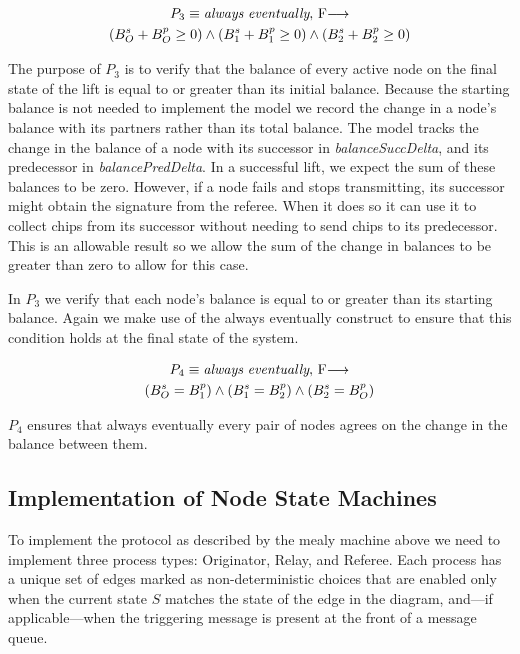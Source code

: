\documentclass[runningheads]{llncs}
\newcommand{\originatorsuccbal}{B^s_O}
\newcommand{\relayasuccbal}{B^s_1}
\newcommand{\relaybsuccbal}{B^s_2}
\newcommand{\originatorpredbal}{B^p_O}
\newcommand{\relayapredbal}{B^p_1}
\newcommand{\relaybpredbal}{B^p_2}
\newcommand{\always}{\emph{always}}
\newcommand{\eventually}{\emph{eventually}}
\newcommand{\fair}{$F$}
\begin{document}
\begin{definition}[Property 3]
\begin{multline*}
P_3 \equiv \always\ \eventually,\ \fair \longrightarrow \\
    (\originatorsuccbal + \originatorpredbal \ge 0) \wedge
    (\relayasuccbal + \relayapredbal \ge 0) \wedge
    (\relaybsuccbal + \relaybpredbal \ge 0) \\
\end{multline*}
\end{definition}

The purpose of $P_3$ is to verify that the balance of every active node on the final state of the lift is equal to or greater than its initial balance. Because the starting balance is not needed to implement the model we record the change in a node's balance with its partners rather than its total balance. The model tracks the change in the balance of a node with its successor in \emph{balanceSuccDelta}, and its predecessor in \emph{balancePredDelta}. In a successful lift, we expect the sum of these balances to be zero. However, if a node fails and stops transmitting, its successor might obtain the signature from the referee. When it does so it can use it to collect chips from its successor without needing to send chips to its predecessor. This is an allowable result so we allow the sum of the change in balances to be greater than zero to allow for this case.

In $P_3$ we verify that each node's balance is equal to or greater than its starting balance. Again we make use of the always eventually construct to ensure that this condition holds at the final state of the system.

\begin{definition}[Property 4]
\begin{multline*}
P_4 \equiv \always\ \eventually,\ \fair \longrightarrow \\
    (\originatorsuccbal = \relayapredbal) \wedge
    (\relayasuccbal = \relaybpredbal) \wedge
    (\relaybsuccbal = \originatorpredbal) \\
\end{multline*}
\end{definition}


$P_4$ ensures that always eventually every pair of nodes agrees on the change in the balance between them. 



\subsection{Implementation of Node State Machines} 
To implement the protocol as described by the mealy machine above we need to implement three process types: Originator, Relay, and Referee. Each process has a unique set of edges marked as non-deterministic choices that are enabled only when the current state $S$ matches the state of the edge in the diagram, and---if applicable---when the triggering message is present at the front of a message queue.
\end{document}

